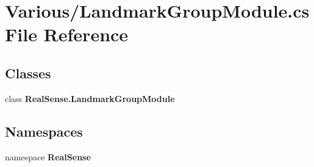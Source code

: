 \section{Various/\+Landmark\+Group\+Module.cs File Reference}
\label{_landmark_group_module_8cs}
\subsection*{Classes}
\begin{DoxyCompactItemize}
\item 
class \textbf{ Real\+Sense.\+Landmark\+Group\+Module}
\end{DoxyCompactItemize}
\subsection*{Namespaces}
\begin{DoxyCompactItemize}
\item 
namespace \textbf{ Real\+Sense}
\end{DoxyCompactItemize}
